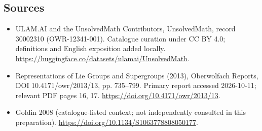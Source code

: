 \documentclass[11pt]{article}
\begin{document}
\subsection{Sources}
\begin{itemize}
\item[\hypertarget{source:30002310:1}{S1}] ULAM.AI and the UnsolvedMath Contributors, UnsolvedMath, record 30002310 (OWR-12341-001). Catalogue curation under CC BY 4.0; definitions and English exposition added locally.
\url{https://huggingface.co/datasets/ulamai/UnsolvedMath}.
\item[\hypertarget{source:30002310:2}{S2}] Representations of Lie Groups and Supergroups (2013), Oberwolfach Reports, DOI 10.4171/owr/2013/13, pp. 735--799. Primary report accessed 2026-10-11; relevant PDF pages 16, 17.
\url{https://doi.org/10.4171/owr/2013/13}.
\item[\hypertarget{source:30002310:3}{S3}] Goldin 2008 (catalogue-listed context; not independently consulted in this preparation).
\url{https://doi.org/10.1134/S1063778808050177}.
\end{itemize}
\label{end:30002310}
\end{document}
